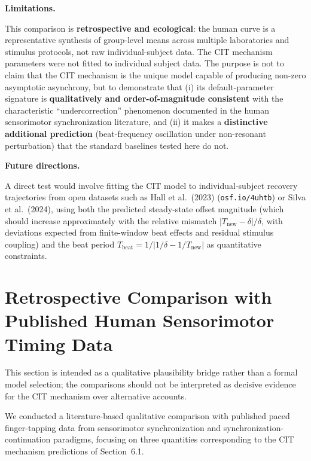 \documentclass[12pt,a4paper]{article}
\begin{document}
\textbf{Limitations.}

This comparison is \textbf{retrospective and ecological}: the human curve is a representative synthesis of group-level means across multiple laboratories and stimulus protocols, not raw individual-subject data. The CIT mechanism parameters were not fitted to individual subject data. The purpose is not to claim that the CIT mechanism is the unique model capable of producing non-zero asymptotic asynchrony, but to demonstrate that (i) its default-parameter signature is \textbf{qualitatively and order-of-magnitude consistent} with the characteristic ``undercorrection'' phenomenon documented in the human sensorimotor synchronization literature, and (ii) it makes a \textbf{distinctive additional prediction} (beat-frequency oscillation under non-resonant perturbation) that the standard baselines tested here do not.



\textbf{Future directions.}

A direct test would involve fitting the CIT model to individual-subject recovery trajectories from open datasets such as Hall et al.~(2023) (\texttt{osf.io/4uhtb}) or Silva et al.~(2024), using both the predicted steady-state offset magnitude (which should increase approximately with the relative mismatch \(|T_{\text{new}} - \delta|/\delta\), with deviations expected from finite-window beat effects and residual stimulus coupling) and the beat period \(T_{\text{beat}} = 1/|1/\delta - 1/T_{\text{new}}|\) as quantitative constraints.



\section{Retrospective Comparison with Published Human Sensorimotor Timing Data}
\label{sec:human_reanalysis}

This section is intended as a qualitative plausibility bridge rather than a formal model selection; the comparisons should not be interpreted as decisive evidence for the CIT mechanism over alternative accounts.





We conducted a literature-based qualitative comparison with published paced finger-tapping data from sensorimotor synchronization and synchronization-continuation paradigms, focusing on three quantities corresponding to the CIT mechanism predictions of Section~6.1.
\end{document}

